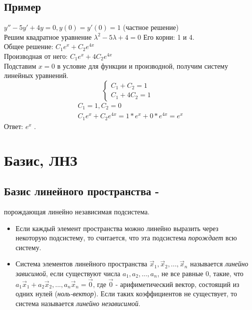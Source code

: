 \documentclass[12pt]{article}
\begin{document}
    \subsection{Пример}
$y''-5y'+4y=0, y(0)=y'(0) = 1$ (частное решение)
    \\
    Решим квадратное уравнение $\lambda^2-5\lambda+4=0$
    Его корни: 1 и 4.
    \\
    Общее решение: $C_1e^x+C_2e^{4x}$
    \\
    Производная от него:  $C_1e^x+4C_2e^{4x}$
    \\
    Подставим $x = 0$ в условие для функции и производной, получим систему линейных уравнений.
    \[
        \begin{cases}
            C_1+C_2=1 \\
            C_1+4C_2=1
        \end{cases}
    \]
    \begin{align*}
         & C_1 = 1, C_2 = 0                        \\
         & C_1e^x+C_2e^{4x} = 1*e^x+0*e^{4x} = e^x
    \end{align*}
    Ответ: $e^x$ .

    \setcounter{section}{32}
    \section{Базис, ЛНЗ}
    \subsection{Базис линейного пространства -} порождающая линейно независимая подсистема.

    \begin{itemize}
        \item Если каждый элемент пространства можно линейно выразить через некоторую подсистему, то считается, что эта подсистема \textit{порождает} всю систему.

        \item Система элементов линейного пространства $\vec x_{1}, \vec x_{2}, ..., \vec x_{n}$ называется \textit{линейно зависимой}, если существуют числа $a_{1}, a_{2},..., a_{n}$, не все равные 0, такие, что $a_{1}\vec x_{1} + a_{2}\vec x_{2},..., a_{n}\vec x_{n} = \vec 0$, где $\vec 0$ - арифиметический вектор, состоящий из одних нулей (\textit{ноль-вектор}). Если таких коэффициентов не существует, то система называется \textit{линейно независимой}.

    \end{itemize}
\end{document}
